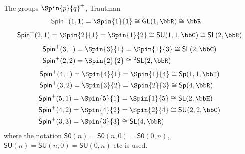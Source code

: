 \begin{example}
\begin{unit}\label{Trautman3}
 The groups $\Spin{p}{q}^+$,
Trautman~\cite{Trautman06,Todorov11}
\[\begin{split}
&\mathsf{Spin}^{+}(1,1)=\Spin{1}{1}\cong\mathsf{GL}(1,\bbR)\cong\bbR
\end{split}\]
\vspace{0mm}
\[\begin{split}
&\mathsf{Spin}^{+}(2,1)=\Spin{2}{1}=\Spin{1}{2}\cong\mathsf{SU}(1,1,\bbC)\cong\mathsf{SL}(2,\bbR)\\
\end{split}\]
\vspace{2mm}
\[\begin{split}
&\mathsf{Spin}^{+}(3,1)=\Spin{3}{1}=\Spin{1}{3}\cong\mathsf{SL}(2,\bbC)\\
&\mathsf{Spin}^{+}(2,2)=\Spin{2}{2}\cong{^2\mathsf{SL}(2,\bbR)}\\%
\end{split}\]
\vspace{2mm}
\[\begin{split}
&\mathsf{Spin}^{+}(4,1)=\Spin{4}{1}=\Spin{1}{4}\cong\mathsf{Sp}(1,1,\bbH)\\
&\mathsf{Spin}^{+}(3,2)=\Spin{3}{2}=\Spin{2}{3}\cong\mathsf{Sp}(4,\bbR)\\
\end{split}\]
\vspace{2mm}
\[\begin{split}
&\mathsf{Spin}^{+}(5,1)=\Spin{5}{1}=\Spin{1}{5}\cong\mathsf{SL}(2,\bbH)\\
&\mathsf{Spin}^{+}(4,2)=\Spin{4}{2}=\Spin{2}{4}\cong\mathsf{SU}(2,2,\bbC)\\
&\mathsf{Spin}^{+}(3,3)=\Spin{3}{3}\cong\mathsf{SL}(4,\bbR)\\
\end{split}\]
where the notation
$\mathsf{S0}(n)=\mathsf{S0}(n,0)=\mathsf{S0}(0,n)$,
$\mathsf{SU}(n)=\mathsf{SU}(n,0)=\mathsf{SU}(0,n)$ etc is used.
\end{unit}
%


\end{example}
